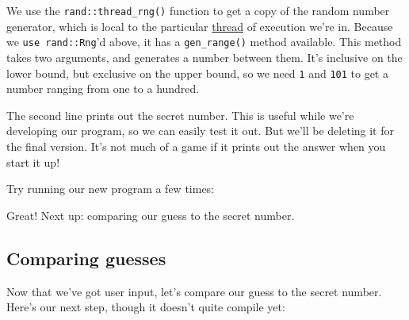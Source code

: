 \documentclass[a4paper,]{book}
\newenvironment{Shaded}{\begin{snugshade}}{\end{snugshade}}
\newcommand{\KeywordTok}[1]{\textcolor[rgb]{0.13,0.29,0.53}{\textbf{{#1}}}}
\newcommand{\NormalTok}[1]{{#1}}
\begin{document}
We use the \texttt{rand::thread\_rng()} function to get a copy of the
random number generator, which is local to the particular
\protect\hyperlink{sec--concurrency}{thread} of execution we're in.
Because we \texttt{use\ rand::Rng}'d above, it has a
\texttt{gen\_range()} method available. This method takes two arguments,
and generates a number between them. It's inclusive on the lower bound,
but exclusive on the upper bound, so we need \texttt{1} and \texttt{101}
to get a number ranging from one to a hundred.

The second line prints out the secret number. This is useful while we're
developing our program, so we can easily test it out. But we'll be
deleting it for the final version. It's not much of a game if it prints
out the answer when you start it up!

Try running our new program a few times:

\begin{Shaded}
\end{Shaded}

Great! Next up: comparing our guess to the secret number.

\subsection{Comparing guesses}\label{comparing-guesses}

Now that we've got user input, let's compare our guess to the secret
number. Here's our next step, though it doesn't quite compile yet:
\end{document}
